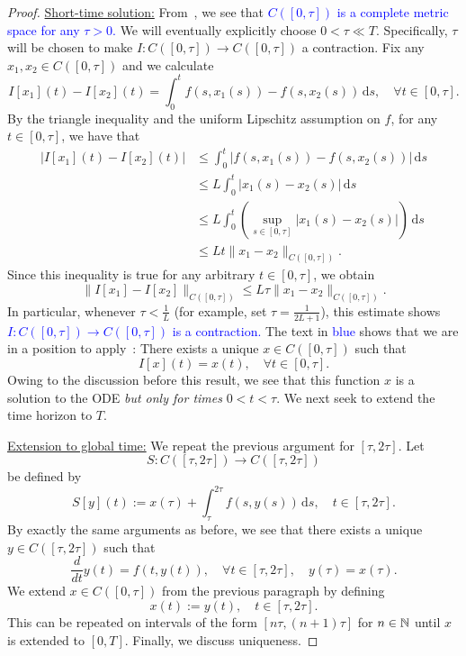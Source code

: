 \begin{proof}
	\ul{Short-time solution:} From~, we see that \textcolor{blue}{$C([0,\tau])$ is a complete metric space for any $\tau>0$.} We will eventually explicitly choose $0 < \tau \ll T$. Specifically, $\tau$ will be chosen to make $I:C([0,\tau])\to C([0,\tau])$ a contraction. Fix any $x_1,x_2\in C([0,\tau])$ and we calculate
	\[
		I[x_1](t) - I[x_2](t) = \int_0^t f(s,x_1(s)) - f(s,x_2(s))\,\mathrm{d}s,\quad \forall t\in[0,\tau].
	\]
	By the triangle inequality and the uniform Lipschitz assumption on $f$, for any $t\in [0,\tau]$, we have that
	\begin{align*}
		|I[x_1](t) - I[x_2](t)| &\le \int_0^t |f(s,x_1(s)) - f(s,x_2(s))|\,\mathrm{d}s 	\\
		&\le L\int_0^t |x_1(s) - x_2(s)|\,\mathrm{d}s 	\\
		&\le L\int_0^t \left(\sup_{s\in[0,\tau]}|x_1(s)-x_2(s)|\right)\,\mathrm{d}s 	\\
		&\le Lt \|x_1-x_2\|_{C([0,\tau])}.
	\end{align*}
	Since this inequality is true for any arbitrary $t\in[0,\tau]$, we obtain
	\[
	\|I[x_1]-I[x_2]\|_{C([0,\tau])}\le L \tau \|x_1-x_2\|_{C([0,\tau])}.
	\]
	In particular, whenever $\tau < \frac{1}{L}$ (for example, set $\tau = \frac{1}{2L+1}$), this estimate shows \textcolor{blue}{$I:C([0,\tau])\to C([0,\tau])$ is a contraction.} The text in \textcolor{blue}{blue} shows that we are in a position to apply~: There exists a unique $x\in C([0,\tau])$ such that
	\[
	I[x](t) = x(t),\quad \forall t\in[0,\tau].
	\]
	Owing to the discussion before this result, we see that this function $x$ is a solution to the ODE \textit{but only for times} $0 < t < \tau$. We next seek to extend the time horizon to $T$.
	
	\ul{Extension to global time:} We repeat the previous argument for $[\tau,2\tau]$. Let
	\[
	S:C([\tau,2\tau])\to C([\tau,2\tau])
	\]
	be defined by
	\[
	S[y](t):= x(\tau) + \int_\tau^{2\tau}f(s,y(s))\,\mathrm{d}s,\quad t\in[\tau,2\tau].
	\]
	By exactly the same arguments as before, we see that there exists a unique $y\in C([\tau,2\tau])$ such that
	\[
	\frac{d}{dt}y(t) = f(t,y(t)),\quad \forall t\in[\tau,2\tau],\quad y(\tau) = x(\tau).
	\]
	We extend $x\in C([0,\tau])$ from the previous paragraph by defining
	\[
	x(t) := y(t),\quad t\in[\tau,2\tau].
	\]
	This can be repeated on intervals of the form $[n\tau,(n+1)\tau]$ for $n\in\mathbb{N}$ until $x$ is extended to $[0,T]$. Finally, we discuss uniqueness.
	

\end{proof}
